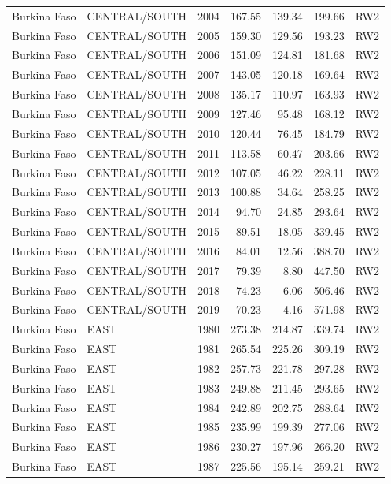 \begin{longtable}{lllrrrl}
  Burkina Faso & CENTRAL/SOUTH & 2004 & 167.55 & 139.34 & 199.66 & RW2 \\ 
  Burkina Faso & CENTRAL/SOUTH & 2005 & 159.30 & 129.56 & 193.23 & RW2 \\ 
  Burkina Faso & CENTRAL/SOUTH & 2006 & 151.09 & 124.81 & 181.68 & RW2 \\ 
  Burkina Faso & CENTRAL/SOUTH & 2007 & 143.05 & 120.18 & 169.64 & RW2 \\ 
  Burkina Faso & CENTRAL/SOUTH & 2008 & 135.17 & 110.97 & 163.93 & RW2 \\ 
  Burkina Faso & CENTRAL/SOUTH & 2009 & 127.46 & 95.48 & 168.12 & RW2 \\ 
  Burkina Faso & CENTRAL/SOUTH & 2010 & 120.44 & 76.45 & 184.79 & RW2 \\ 
  Burkina Faso & CENTRAL/SOUTH & 2011 & 113.58 & 60.47 & 203.66 & RW2 \\ 
  Burkina Faso & CENTRAL/SOUTH & 2012 & 107.05 & 46.22 & 228.11 & RW2 \\ 
  Burkina Faso & CENTRAL/SOUTH & 2013 & 100.88 & 34.64 & 258.25 & RW2 \\ 
  Burkina Faso & CENTRAL/SOUTH & 2014 & 94.70 & 24.85 & 293.64 & RW2 \\ 
  Burkina Faso & CENTRAL/SOUTH & 2015 & 89.51 & 18.05 & 339.45 & RW2 \\ 
  Burkina Faso & CENTRAL/SOUTH & 2016 & 84.01 & 12.56 & 388.70 & RW2 \\ 
  Burkina Faso & CENTRAL/SOUTH & 2017 & 79.39 & 8.80 & 447.50 & RW2 \\ 
  Burkina Faso & CENTRAL/SOUTH & 2018 & 74.23 & 6.06 & 506.46 & RW2 \\ 
  Burkina Faso & CENTRAL/SOUTH & 2019 & 70.23 & 4.16 & 571.98 & RW2 \\ 
  Burkina Faso & EAST & 1980 & 273.38 & 214.87 & 339.74 & RW2 \\ 
  Burkina Faso & EAST & 1981 & 265.54 & 225.26 & 309.19 & RW2 \\ 
  Burkina Faso & EAST & 1982 & 257.73 & 221.78 & 297.28 & RW2 \\ 
  Burkina Faso & EAST & 1983 & 249.88 & 211.45 & 293.65 & RW2 \\ 
  Burkina Faso & EAST & 1984 & 242.89 & 202.75 & 288.64 & RW2 \\ 
  Burkina Faso & EAST & 1985 & 235.99 & 199.39 & 277.06 & RW2 \\ 
  Burkina Faso & EAST & 1986 & 230.27 & 197.96 & 266.20 & RW2 \\ 
  Burkina Faso & EAST & 1987 & 225.56 & 195.14 & 259.21 & RW2 \\ 

\end{longtable}
